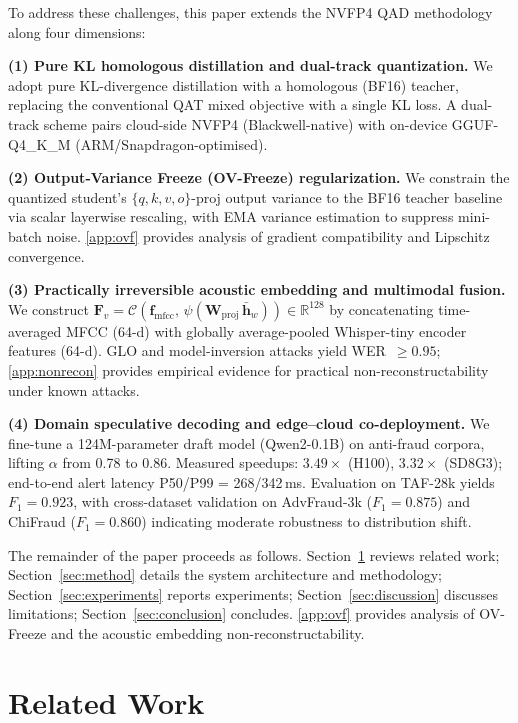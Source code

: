 \documentclass[final,5p,times,number]{elsarticle}
\begin{document}
To address these challenges, this paper extends the NVFP4 QAD methodology along four dimensions:

\textbf{(1) Pure KL homologous distillation and dual-track quantization.} We adopt pure KL-divergence distillation with a homologous (BF16) teacher, replacing the conventional QAT mixed objective with a single KL loss. A dual-track scheme pairs cloud-side NVFP4 (Blackwell-native) with on-device GGUF-Q4\_K\_M (ARM/Snapdragon-optimised).

\textbf{(2) Output-Variance Freeze (OV-Freeze) regularization.} We constrain the quantized student's $\{q,k,v,o\}$-proj output variance to the BF16 teacher baseline via scalar layerwise rescaling, with EMA variance estimation to suppress mini-batch noise. \ref{app:ovf} provides analysis of gradient compatibility and Lipschitz convergence.

\textbf{(3) Practically irreversible acoustic embedding and multimodal fusion.} We construct $\bm{F}_v = \mathcal{C}\!\left(\bm{f}_{\mathrm{mfcc}},\,\psi(\bm{W}_{\mathrm{proj}}\,\bar{\bm{h}}_w)\right) \in \mathbb{R}^{128}$ by concatenating time-averaged MFCC (64-d) with globally average-pooled Whisper-tiny encoder features (64-d). GLO and model-inversion attacks yield WER~$\ge 0.95$; \ref{app:nonrecon} provides empirical evidence for practical non-reconstructability under known attacks.

\textbf{(4) Domain speculative decoding and edge--cloud co-deployment.} We fine-tune a 124M-parameter draft model (Qwen2-0.1B) on anti-fraud corpora, lifting $\alpha$ from 0.78 to 0.86. Measured speedups: $3.49\times$ (H100), $3.32\times$ (SD8G3); end-to-end alert latency P50/P99 = 268/342\,ms. Evaluation on TAF-28k yields $F_1 = 0.923$, with cross-dataset validation on AdvFraud-3k ($F_1 = 0.875$) and ChiFraud ($F_1 = 0.860$) indicating moderate robustness to distribution shift.

The remainder of the paper proceeds as follows. Section~\ref{sec:related} reviews related work; Section~\ref{sec:method} details the system architecture and methodology; Section~\ref{sec:experiments} reports experiments; Section~\ref{sec:discussion} discusses limitations; Section~\ref{sec:conclusion} concludes. \ref{app:ovf} provides analysis of OV-Freeze and the acoustic embedding non-reconstructability.

\section{Related Work}\label{sec:related}
\end{document}
